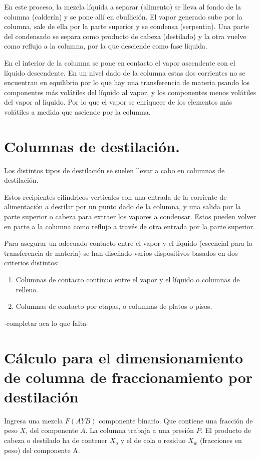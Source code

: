 \documentclass[11pt,openany]{book}
\begin{document}
En este proceso, la mezcla líquida a separar (alimento) se lleva al fondo de la columna (calderín) y 
se pone allí en ebullición. El vapor generado sube por la columna, sale de ella por la parte superior y 
se condensa (serpentin). Una parte del condensado se separa como producto de cabeza (destilado) y la otra 
vuelve como reflujo a la columna, por la que desciende como fase líquida.

En el interior de la columna se pone en contacto el vapor ascendente con el líquido descendente. 
En un nivel dado de la columna estas dos corrientes no se encuentran en equilibrio por lo que hay 
una transferencia de materia psando los componentes más volátiles del líquido al vapor, y los 
componentes menos volátiles del vapor al líquido. Por lo que el vapor se enriquece de los 
elementos más volátiles a medida que asciende por la columna.

\section {Columnas de destilación.}

Los distintos tipos de destilación se suelen llevar a cabo en columnas de destilación.

Estos recipientes cilíndricos verticales con una entrada de la corriente de alimentación a 
destilar por un punto dado de la columna, y una salida por la parte superior o cabeza para extraer 
los vapores a condensar. Estos pueden volver en parte a la columna como reflujo a través de otra entrada por la 
parte superior.

Para asegurar un adecuado contacto entre el vapor y el líquido (escencial para la transferencia de materia) se han 
diseñado varios dispositivos basados en dos criterios distintos:
\begin{enumerate}
\item Columnas de contacto contínuo entre el vapor y el líquido o columnas de relleno.
\item Columnas de contacto por etapas, o columnas de platos o pisos.
\end{enumerate}
-completar aca lo que falta-

\section{Cálculo para el dimensionamiento de columna de fraccionamiento por destilación}

Ingresa una mezcla $F(A Y B)$ componente binario. Que contiene una fracción de peso $X$,
del componente $A$.
La columna trabaja a una presión $P$.
El producto de cabeza o destilado ha de contener $X_o$ y el de cola o residuo $X_w$
(fracciones en peso) del componente A.
\end{document}
